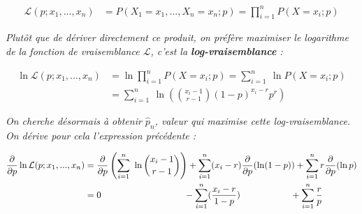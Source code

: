 \documentclass[a4paper,11pt]{article}
\theoremstyle{nonumberplain}
\theoremstyle{nonumberplain}
\theoremstyle{nonumberplain}
\theoremstyle{nonumberplain}
\begin{document}
    \begin{calculs}
        \vspace{-2ex}
        \begin{equation*}
        \begin{split}
            \mathcal{L}(p; x_1,...,x_n) & = P(X_1 = x_1, ..., X_n = x_n;p) = \prod\limits_{i = 1}^{n} P(X = x_i; p)
        \end{split}
        \end{equation*}

        \emph{Plutôt que de dériver directement ce produit, on préfère maximiser
        le logarithme de la fonction de vraisemblance $\mathcal{L}$, c'est la \textbf{log-vraisemblance} :}

        \vspace{-2ex}
        \begin{equation*}
        \begin{split}
            \ln \mathcal{L}(p; x_1,...,x_n) & = \ln \prod\limits_{i = 1}^{n} P(X = x_i; p) = \sum\limits_{i = 1}^{n}\ \ln P(X = x_i; p) \\
                                            & = \sum\limits_{i = 1}^{n}\ \ln \left(\binom{x_i - 1}{r - 1} (1 - p)^{x_i - r} p^{r} \right)
        \end{split}
        \end{equation*}

        \medskip
        \emph{On cherche désormais à obtenir $\hat{p}_n$, valeur qui maximise
        cette log-vraisemblance. On dérive pour cela l'expression précédente :}

        \vspace{-2ex}
        \begin{equation*}
        \begin{split}
            \frac{\partial}{\partial p} \ln \mathcal{L}(p; x_1,...,x_n) & = \frac{\partial}{\partial p}
                \left( \sum\limits_{i = 1}^{n}\ \ln \binom{x_i - 1}{r - 1} \right) + \sum\limits_{i = 1}^{n} (x_i - r) \frac{\partial}{\partial p} (\ln(1-p))
                + \sum\limits_{i = 1}^{n} r \frac{\partial}{\partial p} (\ln p)  \\
                & = 0\hspace{21.5ex}- \sum\limits_{i = 1}^{n} (\frac{x_i - r}{1 - p})\hspace{13ex}+ \sum\limits_{i = 1}^{n} \frac{r}{p}
        \end{split}
        \end{equation*}


\end{calculs}
\end{document}
